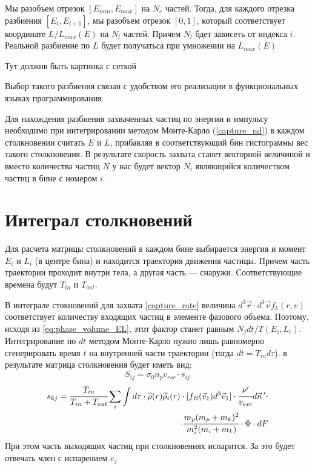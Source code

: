 Мы разобъем отрезок $[E_{min},E_{max}]$ на $N_e$ частей. Тогда, для каждого 
отрезка разбиения $[E_{i},E_{i+1}]$, мы разобъем отрезок $[0,1]$, который соответствует координате $L/L_{max}(E)$ на $N_l$ частей. Причем
$N_l$ бдет зависеть от индекса $i$. Реальной разбиение по $L$ будет получатьса при умножении на $L_{max}(E)$

\begin{LARGE}
	Тут должнв быть картинка с сеткой
\end{LARGE}

Выбор такого разбиения связан с удобством его реализации в функциональных языках программирования.

Для нахождения разбиения захваченных частиц по энергии и импульсу необходимо при интегрировании методом Монте-Карло (\ref{capture_nd}) в каждом столкновении считать $E$ и $L$, прибавляя в соответствующий бин гистограммы вес такого столкновения. В результате
скорость захвата станет векторной величиной и вместо количества частиц $N$ у нас будет
вектор $N_i$ являющийся количеством частиц в бине с номером $i$.

\section{Интеграл столкновений}
Для расчета матрицы столкновений в каждом бине выбирается энергия и момент $E_i$ и $L_i$ (в центре бина) и находится траектория движения частицы. Причем часть траектории проходит внутри тела, а другая часть --- снаружи. Соответствующие времена  будут $T_{in}$ и $T_{out}$. 

В интеграле стокновений для захвата \ref{capture_rate} величина $d^{3}\vec{r} \cdot d^{3}\vec{v}f_{k}(r,v)$ соответствует количеству входящих частиц в элементе фазового объема. Поэтому, исходя из \ref{eq:phase_volume_EL}, этот фактор станет равным $N_{j}dt/T(E_i,L_i)$. Интегрирование по $dt$ методом Монте-Карло нужно лишь равномерно сгенерировать время $t$ на внутренней части траектории (тогда $dt = T_{in} d\tau$). в результате матрица столкновения будет иметь вид:
\begin{equation}
	\label{matrix_simple}
	S_{ij} = \sigma_{0} n_p v_{esc} \cdot s_{ij}
\end{equation}
\begin{equation}
	\begin{split}
	\label{st_nd}
	s_{kj} = \cfrac{T_{in}}{T_{in}+T_{out}} \sum_i \int d\tau \cdot \widehat{\rho}(r) \widetilde{\rho}_i(r) 
		\cdot[f_{B}(\vec{v}_1) d^3\vec{v}_1] \cdot 
		\cfrac{\nu'}{v_{esc}} d\vec{n}\,' \cdot \\
		\cdot \cfrac{m_{p} (m_p+m_k)^2}{m_i^2 ( m_i + m_k)}
		\cdot \Phi \cdot dF
	\end{split}
\end{equation}
При этом часть выходящих частиц при столкновениях испарится. За это будет отвечать член с испарением $e_j$


